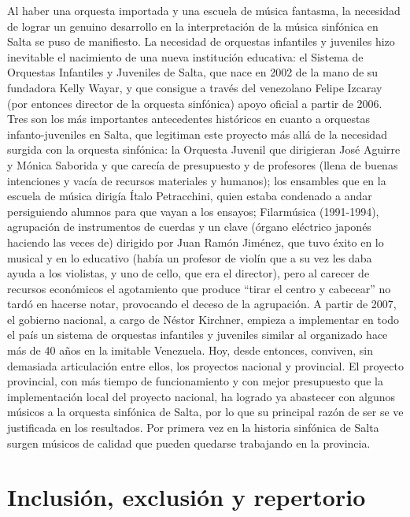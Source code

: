 Al haber una orquesta importada y una escuela de música fantasma, la necesidad de lograr un genuino desarrollo en la interpretación de la música sinfónica en Salta se puso de manifiesto. La necesidad de orquestas infantiles y juveniles hizo inevitable el nacimiento de una nueva institución educativa: el Sistema de Orquestas Infantiles y Juveniles de Salta, que nace en 2002 de la mano de su fundadora Kelly Wayar, y que consigue a través del venezolano Felipe Izcaray (por entonces director de la orquesta sinfónica) apoyo oficial a partir de 2006. Tres son los más importantes antecedentes históricos en cuanto a orquestas infanto-juveniles en Salta, que legitiman este proyecto más allá de la necesidad surgida con la orquesta sinfónica: la Orquesta Juvenil que dirigieran José Aguirre y Mónica Saborida y que carecía de presupuesto y de profesores (llena de buenas intenciones y vacía de recursos materiales y humanos); los ensambles que en la escuela de música dirigía Ítalo Petracchini, quien estaba condenado a andar persiguiendo alumnos para que vayan a los ensayos; Filarmúsica (1991-1994), agrupación de instrumentos de cuerdas y un clave (órgano eléctrico japonés haciendo las veces de) dirigido por Juan Ramón Jiménez, que tuvo éxito en lo musical y en lo educativo (había un profesor de violín que a su vez les daba ayuda a los violistas, y uno de cello, que era el director), pero al carecer de recursos económicos el agotamiento que produce ``tirar el centro y cabecear'' no tardó en hacerse notar, provocando el deceso de la agrupación. A partir de 2007, el gobierno nacional, a cargo de Néstor Kirchner, empieza a implementar en todo el país un sistema de orquestas infantiles y juveniles similar al organizado hace más de 40 años en la imitable Venezuela. Hoy, desde entonces, conviven, sin demasiada articulación entre ellos, los proyectos nacional y provincial. El proyecto provincial, con más tiempo de funcionamiento y con mejor presupuesto que la implementación local del proyecto nacional, ha logrado ya abastecer con algunos músicos a la orquesta sinfónica de Salta, por lo que su principal razón de ser se ve justificada en los resultados. Por primera vez en la historia sinfónica de Salta surgen músicos de calidad que pueden quedarse trabajando en la provincia.


\section{Inclusión, exclusión y repertorio}


